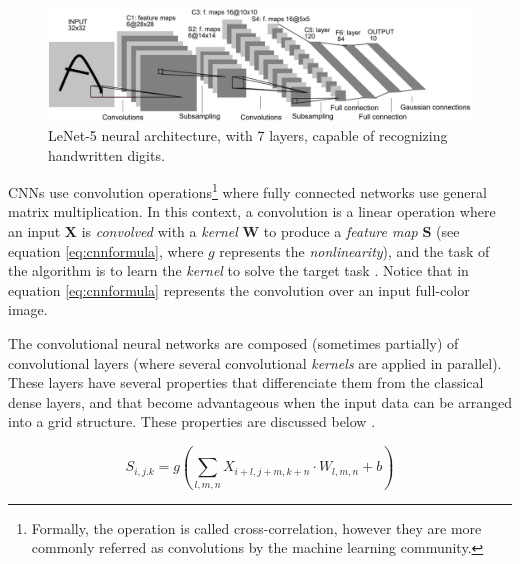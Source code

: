 \begin{figure}
	\centering
	\includegraphics[width=0.7\linewidth]{chapter2/images/lenet5}
	\caption{LeNet-5 neural architecture, with 7 layers, capable of recognizing handwritten digits.}
	\label{fig:lenet5}
\end{figure}

CNNs use convolution operations\footnote{Formally, the operation is called cross-correlation, however they are more commonly referred as convolutions by the machine learning community.} where fully connected networks use general matrix multiplication. In this context, a convolution is a linear operation where an input $\mathbf{X}$ is \textit{convolved} with a \textit{kernel} $\mathbf{W}$ to produce a \textit{feature map} $\mathbf{S}$ (see equation \ref{eq:cnnformula}, where $g$ represents the \textit{nonlinearity}), and the task of the algorithm is to learn the \textit{kernel} to solve the target task \cite{haykin1998}. Notice that in equation \ref{eq:cnnformula} represents the convolution over an input full-color image.

The convolutional neural networks are composed (sometimes partially) of convolutional layers (where several convolutional \textit{kernels} are applied in parallel). These layers have several properties that differenciate them from the classical dense layers, and that become advantageous when the input data can be arranged into a grid structure. These properties are discussed below \cite{Goodfellow2016}.

\begin{equation}
\label{eq:cnnformula}
S_{i,j.k} = g\left(\sum_{l,m,n}{X_{i+l, j+m, k+n} \cdot W_{l,m,n} + b}\right)
\end{equation}

